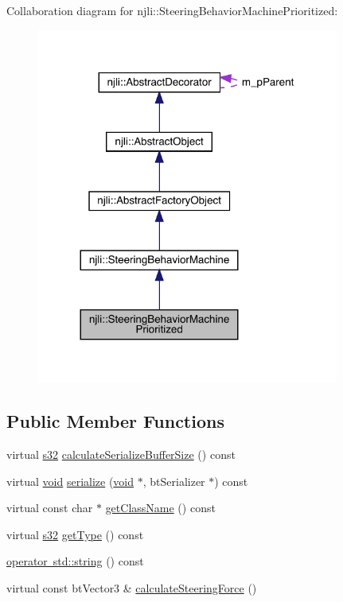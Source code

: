 Collaboration diagram for njli\+:\+:Steering\+Behavior\+Machine\+Prioritized\+:\nopagebreak
\begin{figure}[H]
\begin{center}
\leavevmode
\includegraphics[width=281pt]{classnjli_1_1_steering_behavior_machine_prioritized__coll__graph}
\end{center}
\end{figure}
\subsection*{Public Member Functions}
\begin{DoxyCompactItemize}
\item 
virtual \mbox{\hyperlink{_util_8h_aa62c75d314a0d1f37f79c4b73b2292e2}{s32}} \mbox{\hyperlink{classnjli_1_1_steering_behavior_machine_prioritized_aa05ec0e843f46f25b03794f0a9a9f483}{calculate\+Serialize\+Buffer\+Size}} () const
\item 
virtual \mbox{\hyperlink{_thread_8h_af1e856da2e658414cb2456cb6f7ebc66}{void}} \mbox{\hyperlink{classnjli_1_1_steering_behavior_machine_prioritized_a2f3fa591ca198f2d45b1d49d73173b65}{serialize}} (\mbox{\hyperlink{_thread_8h_af1e856da2e658414cb2456cb6f7ebc66}{void}} $\ast$, bt\+Serializer $\ast$) const
\item 
virtual const char $\ast$ \mbox{\hyperlink{classnjli_1_1_steering_behavior_machine_prioritized_a0688707312da3b16368bbe4a8ed28462}{get\+Class\+Name}} () const
\item 
virtual \mbox{\hyperlink{_util_8h_aa62c75d314a0d1f37f79c4b73b2292e2}{s32}} \mbox{\hyperlink{classnjli_1_1_steering_behavior_machine_prioritized_adbf4f6b3ea233a5ae575d366b977d630}{get\+Type}} () const
\item 
\mbox{\hyperlink{classnjli_1_1_steering_behavior_machine_prioritized_a3268888171ef4efd85513b14616f47a8}{operator std\+::string}} () const
\item 
virtual const bt\+Vector3 \& \mbox{\hyperlink{classnjli_1_1_steering_behavior_machine_prioritized_a3260a17ae2fe1f5fb128915e3d2ab1b6}{calculate\+Steering\+Force}} ()
\end{DoxyCompactItemize}
